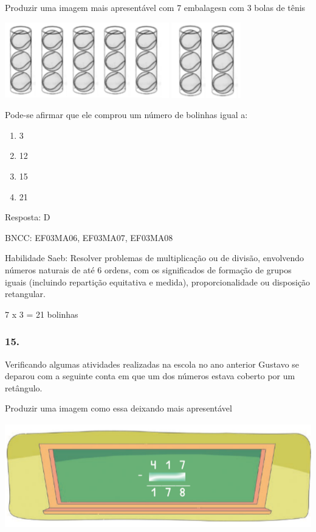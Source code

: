 Produzir uma imagem mais apresentável com 7 embalagesn com 3 bolas de
tênis

\includegraphics[width=2.80882in,height=1.29243in]{media/image139.png}
\includegraphics[width=1.18628in,height=1.28713in]{media/image140.png}

Pode-se afirmar que ele comprou um número de bolinhas igual a:

\begin{enumerate}
\def\labelenumi{\alph{enumi})}
\item
  3
\item
  12
\item
  15
\item
  21
\end{enumerate}

Resposta: D

BNCC: EF03MA06, EF03MA07, EF03MA08

Habilidade Saeb: Resolver problemas de multiplicação ou de divisão,
envolvendo números naturais de até 6 ordens, com os significados de
formação de grupos iguais (incluindo repartição equitativa e medida),
proporcionalidade ou disposição retangular.

7 x 3 = 21 bolinhas

\subsubsection{15. }\label{section-181}

Verificando algumas atividades realizadas na escola no ano anterior
Gustavo se deparou com a seguinte conta em que um dos números estava
coberto por um retângulo.

Produzir uma imagem como essa deixando mais apresentável

\includegraphics[width=5.39213in,height=1.80849in]{media/image141.png}

